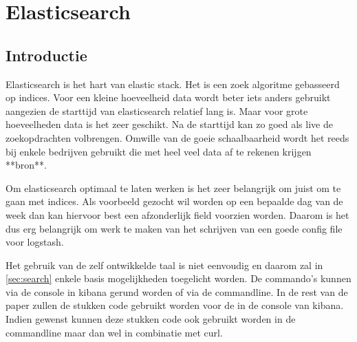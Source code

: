 
\chapter{Elasticsearch}
\label{ch:elasticsearch}

\section{Introductie}
\label{sec:introductie}

Elasticsearch is het hart van elastic stack. Het is een zoek algoritme gebasseerd op indices.
Voor een kleine hoeveelheid data wordt beter iets anders gebruikt aangezien de starttijd van elasticsearch relatief lang is.
Maar voor grote hoeveelheden data is het zeer geschikt. Na de starttijd kan zo goed als live de zoekopdrachten volbrengen. 
Omwille van de goeie schaalbaarheid wordt het reeds bij enkele bedrijven gebruikt die met heel veel data af te rekenen krijgen **bron**.

Om elasticsearch optimaal te laten werken is het zeer belangrijk om juist om te gaan met indices. Als voorbeeld gezocht wil worden op een bepaalde dag van de week dan kan hiervoor best een afzonderlijk field voorzien worden. 
Daarom is het dus erg belangrijk om werk te maken van het schrijven van een goede config file voor logstash.

Het gebruik van de zelf ontwikkelde taal is niet eenvoudig en daarom zal in \hyperref[sec:search]{\ref{sec:search}} enkele basis mogelijkheden toegelicht worden.
De commando's kunnen via de console in kibana gerund worden of via de commandline. In de rest van de paper zullen de stukken code gebruikt worden voor de in de console van kibana.
Indien gewenst kunnen deze stukken code ook gebruikt worden in de commandline maar dan wel in combinatie met curl.

